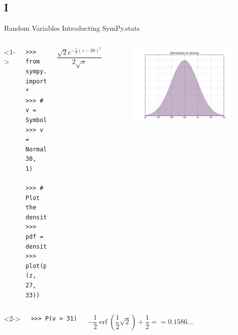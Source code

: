 \documentclass[compress, blue]{beamer}
\begin{document}
\subsection{I}
\begin{frame}{Random Variables}
Introducting SymPy.stats
\begin{columns}<1->


\begin{lstlisting}
>>> from sympy.stats import *
>>> # v = Symbol('v')
>>> v = Normal('v', 30, 1)

>>> # Plot the density
>>> pdf = density(v)
>>> plot(pdf(z), (z, 27, 33))
\end{lstlisting}
$$\frac{\sqrt{2} e^{- \frac{1}{2} \left(z -30\right)^{2}}}{2 \sqrt{\pi}}
$$
    \begin{figure}
        \includegraphics[width=\textwidth]{images/velocity-distribution.pdf}
    \end{figure}
\end{columns}

\begin{columns}<2->

\begin{lstlisting}
>>> P(v > 31)
\end{lstlisting}


    $$ - \frac{1}{2} \operatorname{erf}{\left (\frac{1}{2} \sqrt{2} \right )} 
       + \frac{1}{2} == 0.1586...$$

\end{columns}

\end{frame}
\end{document}
